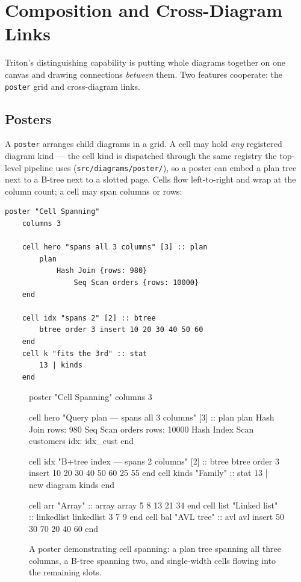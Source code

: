 \section{Composition and Cross-Diagram Links}
\label{sec:composition}

Triton's distinguishing capability is putting whole diagrams together on one
canvas and drawing connections \emph{between} them. Two features cooperate: the
\texttt{poster} grid and cross-diagram links.

\subsection{Posters}

A \texttt{poster} arranges child diagrams in a grid. A cell may hold \emph{any}
registered diagram kind --- the cell kind is dispatched through the same registry
the top-level pipeline uses (\texttt{src/diagrams/poster/}), so a poster can embed
a plan tree next to a B-tree next to a slotted page. Cells flow left-to-right and
wrap at the column count; a cell may span columns or rows:

\begin{lstlisting}[language=triton]
poster "Cell Spanning"
    columns 3

    cell hero "spans all 3 columns" [3] :: plan
        plan
            Hash Join {rows: 980}
                Seq Scan orders {rows: 10000}
    end

    cell idx "spans 2" [2] :: btree
        btree order 3 insert 10 20 30 40 50 60
    end
    cell k "fits the 3rd" :: stat
        13 | kinds
    end
\end{lstlisting}

\begin{figure}[htbp]
  \centering
\begin{triton}
poster "Cell Spanning"
    columns 3

    cell hero "Query plan — spans all 3 columns" [3] :: plan
        plan
            Hash Join {rows: 980}
                Seq Scan orders {rows: 10000}
                Hash
                    Index Scan customers {idx: idx_cust}
    end

    cell idx "B+tree index — spans 2 columns" [2] :: btree
        btree order 3 insert 10 20 30 40 50 60 25 55
    end
    cell kinds "Family" :: stat
        13 | new diagram kinds
    end

    cell arr "Array" :: array
        array 5 8 13 21 34
    end
    cell list "Linked list" :: linkedlist
        linkedlist 3 7 9
    end
    cell bal "AVL tree" :: avl
        avl insert 50 30 70 20 40 60
    end
\end{triton}
  \caption{A poster demonstrating cell spanning: a plan tree spanning all
three columns, a B-tree spanning two, and single-width cells flowing into the
remaining slots.}
\end{figure}

